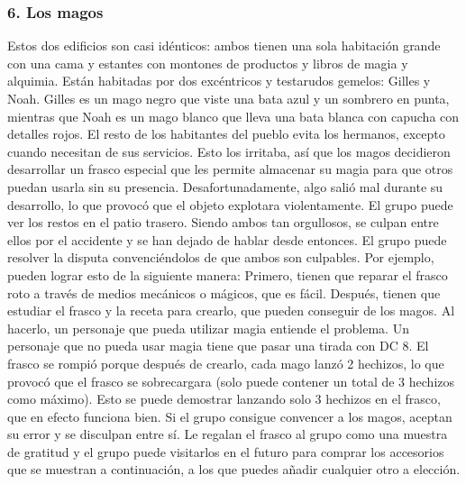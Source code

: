 \subsubsection*{6. Los magos}
Estos dos edificios son casi idénticos: ambos tienen una sola habitación grande con una cama y estantes con montones de productos y libros de magia y alquimia. Están habitadas por dos excéntricos y testarudos gemelos: Gilles y Noah. Gilles es un mago negro que viste una bata azul y un sombrero en punta, mientras que Noah es un mago blanco que lleva una bata blanca con capucha con detalles rojos. El resto de los habitantes del pueblo evita los hermanos, excepto cuando necesitan de sus servicios. Esto los irritaba, así que los magos decidieron desarrollar un frasco especial que les permite almacenar su magia para que otros puedan usarla sin su presencia. Desafortunadamente, algo salió mal durante su desarrollo, lo que provocó que el objeto explotara violentamente. El grupo puede ver los restos en el patio trasero. Siendo ambos tan orgullosos, se culpan entre ellos por el accidente y se han dejado de hablar desde entonces. El grupo puede resolver la disputa convenciéndolos de que ambos son culpables. Por ejemplo, pueden lograr esto de la siguiente manera: Primero, tienen que reparar el frasco roto a través de medios mecánicos o mágicos, que es fácil. Después, tienen que estudiar el frasco y la receta para crearlo, que pueden conseguir de los magos. Al hacerlo, un personaje que pueda utilizar magia entiende el problema. Un personaje que no pueda usar magia tiene que pasar una tirada con DC 8. El frasco se rompió porque después de crearlo, cada mago lanzó 2 hechizos, lo que provocó que el frasco se sobrecargara (solo puede contener un total de 3 hechizos como máximo). Esto se puede demostrar lanzando solo 3 hechizos en el frasco, que en efecto funciona bien. Si el grupo consigue convencer a los magos, aceptan su error y se disculpan entre sí. Le regalan el frasco al grupo como una muestra de gratitud y el grupo puede visitarlos en el futuro para comprar los accesorios que se muestran a continuación, a los que puedes añadir cualquier otro a elección.
%
\vspace{0.3cm}
%

